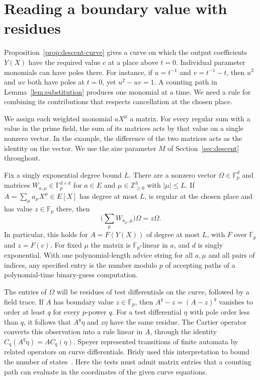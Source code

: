 \section{Reading a boundary value with residues}\label{sec:cartier}

Proposition~\ref{prop:descent-curve} gives a curve on which the output
coefficients $Y(X)$ have the required value $c$ at a place above $t=0$.
Individual parameter monomials can have poles there. For instance,
if $u=t^{-1}$ and $v=t^{-1}-t$, then $u^2$ and $uv$ both have poles
at $t=0$, yet $u^2-uv=1$. A counting path in
Lemma~\ref{lem:substitution} produces one monomial at a time. We need
a rule for combining its contributions that respects cancellation at
the chosen place.

We assign each weighted monomial $aX^\mu$ a matrix. For every regular
sum with a value in the prime field, the sum of its matrices acts by
that value on a single nonzero vector. In the example, the difference
of the two matrices acts as the identity on the vector. We use the size
parameter $M$ of Section~\ref{sec:descent} throughout.

\begin{lemma}\label{lem:pins}
Fix a singly exponential degree bound $L$. There are a nonzero vector
$\Omega\in\mathbb F_p^d$ and matrices $W_{a,\mu}\in\mathbb F_p^{d\times d}$
for $a\in E$ and $\mu\in\mathbb Z_{\ge0}^{h}$ with $|\mu|\le L$.
If $A=\sum_\mu a_\mu X^\mu\in E[X]$ has degree at most $L$, is
regular at the chosen place and has value $z\in\mathbb F_p$ there, then
\begin{equation}\label{eq:cartier-pin}
                 \biggl(\sum_\mu W_{a_\mu,\mu}\biggr)\Omega=z\Omega .
\end{equation}
In particular, this holds for $A=F(Y(X))$ of degree at most $L$,
with $F$ over $\mathbb F_p$ and $z=F(c)$. For fixed $\mu$ the matrix
is $\mathbb F_p$-linear in $a$, and $d$ is singly exponential. With
one polynomial-length advice string for all $a,\mu$ and all pairs of
indices, any specified entry is the number modulo $p$ of accepting
paths of a polynomial-time binary-guess computation.
\end{lemma}

The entries of $\Omega$ will be residues of test differentials on
the curve, followed by a field trace. If $A$ has boundary value
$z\in\mathbb F_p$, then $A^q-z=(A-z)^q$ vanishes to order at least
$q$ for every $p$-power $q$. For a test differential $\eta$ with pole
order less than $q$, it follows that $A^q\eta$ and $z\eta$ have the same
residue. The Cartier operator converts this observation into a rule
linear in $A$, through the identity $C_q(A^q\eta)=A C_q(\eta)$.
Speyer represented transitions of finite automata by related operators
on curve differentials. Bridy used this interpretation to bound the
number of states~\cite[Proposition~3.8 and Theorem~1.2]{Bridy}.
Here the tests must admit matrix entries that a counting path can
evaluate in the coordinates of the given curve equations.

